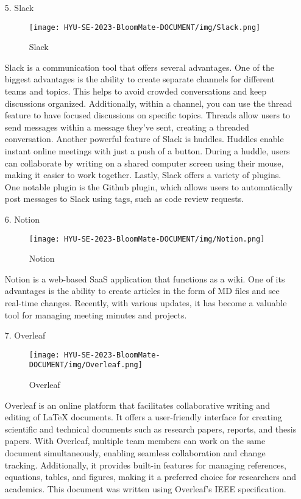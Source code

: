 \documentclass[conference, a4paper]{IEEEtran}
\begin{document}
\begin{enumerate}
    \item[5.]Slack
    \begin{figure}[h]
    \centering
    \texttt{[image: HYU-SE-2023-BloomMate-DOCUMENT/img/Slack.png]}
    \label{fig:Slack}
    \caption{Slack} 
    \end{figure}
    \item[]Slack is a communication tool that offers several advantages. One of the biggest advantages is the ability to create separate channels for different teams and topics. This helps to avoid crowded conversations and keep discussions organized. Additionally, within a channel, you can use the thread feature to have focused discussions on specific topics. Threads allow users to send messages within a message they've sent, creating a threaded conversation. Another powerful feature of Slack is huddles. Huddles enable instant online meetings with just a push of a button. During a huddle, users can collaborate by writing on a shared computer screen using their mouse, making it easier to work together. Lastly, Slack offers a variety of plugins. One notable plugin is the Github plugin, which allows users to automatically post messages to Slack using tags, such as code review requests.\\

    \item[6.]Notion
    \begin{figure}[h]
    \centering
    \texttt{[image: HYU-SE-2023-BloomMate-DOCUMENT/img/Notion.png]}
    \label{fig:Notion}
    \caption{Notion} 
    \end{figure}
    \item[]Notion is a web-based SaaS application that functions as a wiki. One of its advantages is the ability to create articles in the form of MD files and see real-time changes. Recently, with various updates, it has become a valuable tool for managing meeting minutes and projects.\\
    

    \item[7.]Overleaf
    \begin{figure}[h]
    \centering
    \texttt{[image: HYU-SE-2023-BloomMate-DOCUMENT/img/Overleaf.png]}
    \label{fig:Overleaf}
    \caption{Overleaf} 
    \end{figure}
    \item[]Overleaf is an online platform that facilitates collaborative writing and editing of LaTeX documents. It offers a user-friendly interface for creating scientific and technical documents such as research papers, reports, and thesis papers. With Overleaf, multiple team members can work on the same document simultaneously, enabling seamless collaboration and change tracking. Additionally, it provides built-in features for managing references, equations, tables, and figures, making it a preferred choice for researchers and academics. This document was written using Overleaf's IEEE specification.\\



\end{enumerate}
\end{document}
